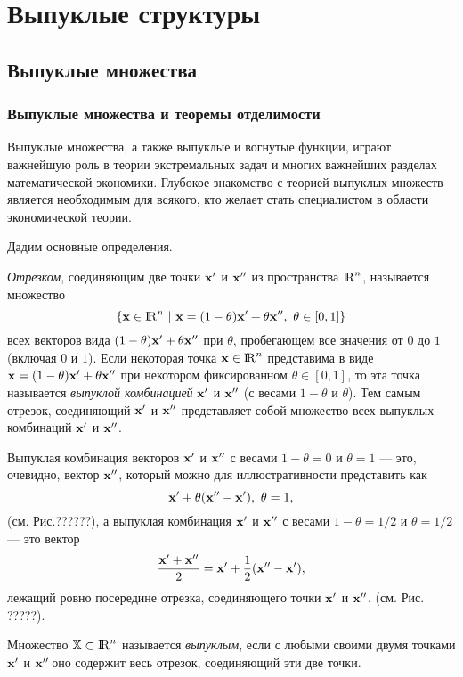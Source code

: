\chapter{Выпуклые структуры}

\section{Выпуклые множества}

\subsection{Выпуклые множества и теоремы отделимости}


    Выпуклые множества, а также выпуклые и вогнутые функции,
    играют важнейшую роль в теории экстремальных задач
    и многих важнейших разделах
    математической экономики. Глубокое знакомство с теорией выпуклых
    множеств является необходимым для всякого, кто желает стать
    специалистом в области экономической теории.

    Дадим основные определения.

    \emph{Отрезком}, соединяющим две точки $\mathbf{x}'$ и $\mathbf{x}''$ из
    пространства ${\rm I\!R}^{n}$, называется множество
    \[\{\vc{x}\in\R^{n} \ | \ \vc{x}=(1-\theta)\vc{x}'+\theta\vc{x}'', \ \theta\in[0,1]\}\]
    всех векторов вида
    $(1-\theta)\mathbf{x}'+\theta\mathbf{x}''$
    при $\theta$, пробегающем все
    значения от $0$ до $1$ (включая $0$ и $1$).
    Если некоторая точка $\mathbf{x}\in{\rm I\!R}^{n}$ представима в виде
    $\mathbf{x}=(1-\theta)\mathbf{x}'+\theta\mathbf{x}''$ при некотором фиксированном
    $\theta\in[0,1]$, то эта точка называется \emph{выпуклой комбинацией} $\mathbf{x}'$ и
    $\mathbf{x}''$ (с весами $1-\theta$ и $\theta$). Тем самым отрезок, соединяющий $\mathbf{x}'$ и
    $\mathbf{x}''$ представляет собой множество всех выпуклых комбинаций
    $\mathbf{x}'$ и $\mathbf{x}''$.

    Выпуклая комбинация векторов $\mathbf{x}'$ и $\mathbf{x}''$ с весами
    $1-\theta=0$ и $\theta=1$ --- это, очевидно, вектор $\mathbf{x}''$,
    который можно для иллюстративности представить как
    \[\vc{x}'+\theta(\vc{x}''-\vc{x}'), \ \theta=1,\]
    (см. Рис.??????), а выпуклая комбинация $\mathbf{x}'$ и
    $\mathbf{x}''$ с весами
    $1-\theta=1/2$ и $\theta=1/2$ --- это вектор
\[
    \frac{\mathbf{x}'+\mathbf{x}''}{2}=\mathbf{x}'+\frac{1}{2}(\mathbf{x}''-\mathbf{x}'),
\]
    лежащий ровно посередине отрезка, соединяющего точки $\mathbf{x}'$ и $\mathbf{x}''$.
    (см. Рис. ?????).


    Множество $\mathbb{X}\subset{\rm I\!R}^{n}$ называется \emph{выпуклым}, если с
    любыми своими двумя точками $\mathbf{x}'$ и $\mathbf{x}''\!$ оно
    содержит весь отрезок, соединяющий эти две точки.













